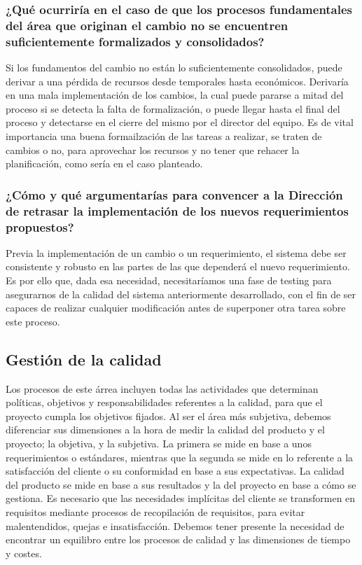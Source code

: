 \documentclass{article}
\begin{document}
\subsubsection{¿Qué ocurriría en el caso de que los procesos fundamentales del área que originan el cambio no se encuentren suficientemente formalizados y consolidados?}

Si los fundamentos del cambio no están lo suficientemente consolidados, puede derivar a una pérdida de recursos desde temporales hasta económicos. Derivaría en una mala implementación de los cambios, la cual puede pararse a mitad del proceso si se detecta la falta de formalización, o puede llegar hasta el final del proceso y detectarse en el cierre del mismo por el director del equipo. Es de vital importancia una buena formailzación de las tareas a realizar, se traten de cambios o no, para aprovechar los recursos y no tener que rehacer la planificación, como sería en el caso planteado.

\subsubsection{¿Cómo y qué argumentarías para convencer a la Dirección de retrasar la implementación de los nuevos requerimientos propuestos?}

Previa la implementación de un cambio o un requerimiento, el sistema debe ser consistente y robusto en las partes de las que dependerá el nuevo requerimiento. Es por ello que, dada esa necesidad, necesitaríamos una fase de testing para asegurarnos de la calidad del sistema anteriormente desarrollado, con el fin de ser capaces de realizar cualquier modificación antes de superponer otra tarea sobre este proceso.

\subsection{Gestión de la calidad}

Los procesos de este árrea incluyen todas las actividades que determinan políticas, objetivos y responsabilidades referentes a la calidad, para que el proyecto cumpla los objetivos fijados. Al ser el área más subjetiva, debemos diferenciar sus dimensiones a la hora de medir la calidad del producto y el proyecto; la objetiva, y la subjetiva. La primera se mide en base a unos requerimientos o estándares, mientras que la segunda se mide en lo referente a la satisfacción del cliente o su conformidad en base a sus expectativas. La calidad del producto se mide en base a sus resultados y la del proyecto en base a cómo se gestiona. Es necesario que las necesidades implícitas del cliente se transformen en requisitos mediante procesos de recopilación de requisitos, para evitar malentendidos, quejas e insatisfacción. Debemos tener presente la necesidad de encontrar un equilibro entre los procesos de calidad y las dimensiones de tiempo y costes.
\end{document}
